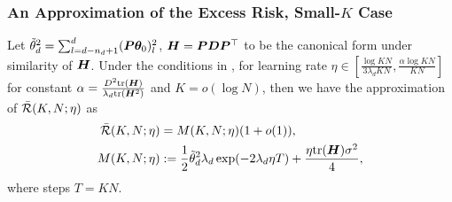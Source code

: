 \subsubsection{An Approximation of the Excess Risk, Small-$K$ Case} \label{sec:convex-loss-estimate-small-K}
\begin{lemma} \label{lem:convex-L-approx-small-K}
     Let $\Tilde{\theta}_{d}^2 = \sum_{l=d-n_d+1}^d({\bm{P}}{\bm{\theta}}_0)_{l}^2$, ${\bm{H}} = {\bm{P}}{\bm{D}}{\bm{P}}^{\top}$ to be the canonical form under similarity of ${\bm{H}}$. Under the conditions in , for learning rate $\eta \in \left[\frac{\log KN}{3\lambda_d KN}, \frac{\alpha\log KN}{KN}\right]$ for constant $\alpha = \frac{D^2 \mathrm{tr}({\bm{H}})}{\lambda_d \mathrm{tr}({\bm{H}}^2)}$ and $K = o(\log N)$, then we have the approximation of $\Bar{\mathcal{R}}(K, N;\eta)$ as
    \begin{align*}
        \Bar{\mathcal{R}}(K, N;\eta) &= M(K, N;\eta)(1+ o(1)),\\
        M(K, N;\eta) &:= \frac{1}{2}\Tilde{\theta}_d^2 \lambda_d \exp(-2\lambda_d \eta T)+\frac{\eta\mathrm{tr}({\bm{H}})\sigma^2}{4},
    \end{align*}
    where steps $T=KN$.
\end{lemma}
